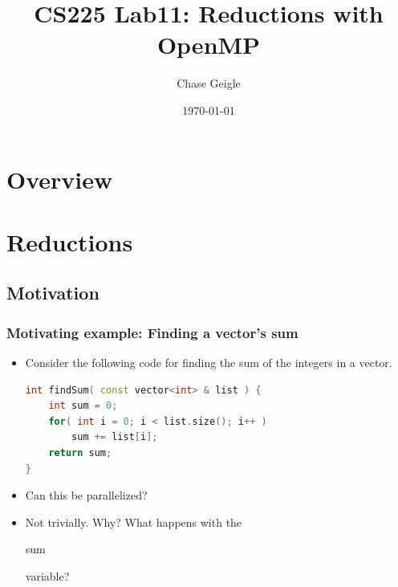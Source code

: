 \documentclass[table]{beamer}
\title[CS225 Lab11: Reductions]{CS225 Lab11: Reductions with OpenMP}
\author{Chase Geigle}
\date{\today}
\institute{CS 225, UIUC}
\newcommand{\ttt}[1]{\begin{tt}#1\end{tt}}
\begin{document}
\frame{\titlepage}
\section{Overview}
\frame{\scriptsize\tableofcontents}

\section{Reductions}
\subsection{Motivation}

\begin{frame}[fragile]
    \frametitle{Motivating example: Finding a vector's sum}
    \begin{itemize}
        \item<1-> Consider the following code for finding the sum of the 
        integers in a vector.
        \begin{lstlisting}[language=C++]
int findSum( const vector<int> & list ) {
    int sum = 0;
    for( int i = 0; i < list.size(); i++ )
        sum += list[i];
    return sum;
}
        \end{lstlisting}
        \item<2-> Can this be parallelized?
        \item<3-> Not trivially. Why? What happens with the \ttt{sum} 
        variable?
    \end{itemize}
\end{frame}

 
\end{document}
